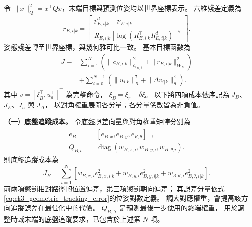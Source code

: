 令 $\|x\|_Q^2=x^\top Qx$，末端目標與預測位姿均以世界座標表示。
六維殘差定義為
\begin{equation}
    r_{E,i|k}=
    \begin{bmatrix}
        p_{E,i|k}^{d}-p_{E,i|k}\\
        R_{E,i|k}
        [\log(R_{E,i|k}^{\top}R_{E,i|k}^{d})]^\vee
    \end{bmatrix}.
    \label{eq:ch3_tcp_pose_residual}
\end{equation}
姿態殘差轉至世界座標，與幾何雅可比一致。
基本目標函數為
\begin{equation}
    \begin{aligned}
        J={}&\sum_{i=1}^{N}
        \left(\|e_{B,i|k}\|_{Q_{B,i}}^2+
              \|r_{E,i|k}\|_{W_E}^2\right)\\
        &+\sum_{i=0}^{N-1}
        \left(\|u_{i|k}\|_R^2+
              \|\Delta v_{i|k}\|_S^2\right).
    \end{aligned}
    \label{eq:ch3_wholebody_objective}
\end{equation}
其中 $v=[\xi_B^\top,u_a^\top]^\top$ 為完整命令，
$\xi_B=\xi_r+\delta\xi$。
以下將四項成本依序記為 $J_B$、$J_E$、$J_u$ 與 $J_\Delta$，
以對角權重展開各分量；各分量係數皆為非負值。

\noindent\textbf{（一）底盤追蹤成本。}
令底盤誤差向量與對角權重矩陣分別為
\[
    \begin{aligned}
        e_B&=[e_{B,x},e_{B,y},e_{B,\theta}]^\top,\\
        Q_{B,i}&=\operatorname{diag}
        (w_{B,x,i},w_{B,y,i},w_{B,\theta,i}).
    \end{aligned}
\]
則底盤追蹤成本為
\begin{equation}
    J_B=\sum_{i=1}^{N}\left[
        w_{B,x,i}e_{B,x,i|k}^{2}
        +w_{B,y,i}e_{B,y,i|k}^{2}
        +w_{B,\theta,i}e_{B,\theta,i|k}^{2}\right].
    \label{eq:ch3_base_tracking_cost_expanded}
\end{equation}
前兩項懲罰相對路徑的位置偏差，第三項懲罰朝向偏差；
其誤差分量依式\eqref{eq:ch3_geometric_tracking_error}的位姿對數定義。
調大對應權重，會提高該方向追蹤誤差在最佳化中的代價。
$Q_{B,N}$ 是預測最後一步使用的終端權重，
用於調整時域末端的底盤追蹤要求，已包含於上述第 $N$ 項。

